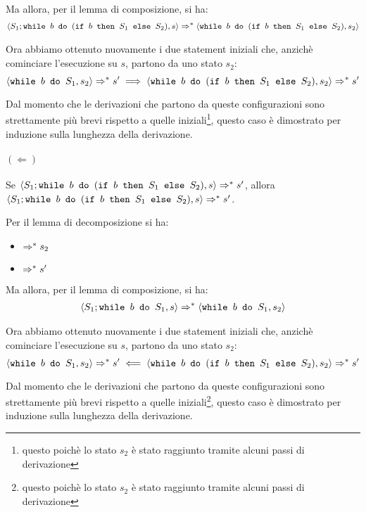 Ma allora, per il lemma di composizione, si ha:
\begin{align*}
\confSs{S_1; \wbS{b}{(\ifABC{b}{S_1}{S_2})}}{s}
\Rar{*}
\confSs{\wbS{b}{(\ifABC{b}{S_1}{S_2})}}{s_2}
\end{align*}

Ora abbiamo ottenuto nuovamente i due statement iniziali che, anzichè
cominciare l'esecuzione su $s$, partono da uno stato $s_2$:
$$
\confSs{\wbS{b}{S_1}}{s_2} \Rar{*} s'
  \implies
\confSs{\wbS{b}{(\ifABC{b}{S_1}{S_2})}}{s_2} \Rar{*} s'
$$

Dal momento che le derivazioni che partono da queste configurazioni sono
strettamente più brevi rispetto a quelle iniziali\footnote{questo poichè lo
stato $s_2$ è stato raggiunto tramite alcuni passi di derivazione}, questo
caso è dimostrato per induzione sulla lunghezza della derivazione.

\paragraph{$(\Leftarrow)$}

Se $\confSs{S_1; \wbS{b}{(\ifABC{b}{S_1}{S_2})}}{s} \Rar{*} s'$, allora
$\confSs{S_1; \wbS{b}{(\ifABC{b}{S_1}{S_2})}}{s} \Rar{*} s'$.

Per il lemma di decomposizione si ha:
\begin{itemize}
  \item {} $\Rar{*} s_2$
  \item {} $\Rar{*} s'$
\end{itemize}

Ma allora, per il lemma di composizione, si ha:
\begin{align*}
\confSs{S_1; \wbS{b}{S_1}}{s}
\Rar{*}
\confSs{\wbS{b}{S_1}}{s_2}
\end{align*}

Ora abbiamo ottenuto nuovamente i due statement iniziali che, anzichè
cominciare l'esecuzione su $s$, partono da uno stato $s_2$:
$$
\confSs{\wbS{b}{S_1}}{s_2} \Rar{*} s'
  \impliedby
\confSs{\wbS{b}{(\ifABC{b}{S_1}{S_2})}}{s_2} \Rar{*} s'
$$

Dal momento che le derivazioni che partono da queste configurazioni sono
strettamente più brevi rispetto a quelle iniziali\footnote{questo poichè lo
stato $s_2$ è stato raggiunto tramite alcuni passi di derivazione}, questo
caso è dimostrato per induzione sulla lunghezza della derivazione.

\cvd


